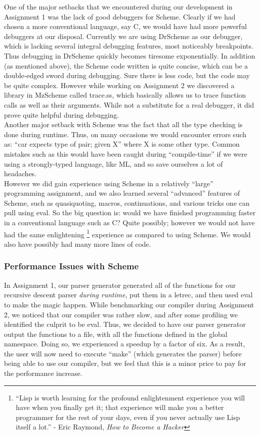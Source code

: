 \documentclass[onecolumn,11pt]{article}
\begin{document}
One of the major setbacks that we encountered during our development in Assignment 1 was the lack of good debuggers for Scheme. Clearly if we had chosen a more conventional language, say C, we would have had more powerful debuggers at our disposal. Currently we are using DrScheme as our debugger, which is lacking several integral debugging features, most noticeably breakpoints. Thus debugging in DrScheme quickly becomes tiresome exponentially. In addition (as mentioned above), the Scheme code written is quite concise, which can be a double-edged sword during debugging. Sure there is less code, but the code may be quite complex. However while working on Assignment 2 we discovered a library in MzScheme called trace.ss, which basically allows us to trace function calls as well as their arguments. While not a substitute for a real debugger, it did prove quite helpful during debugging. \\

Another major setback with Scheme was the fact that all the type checking is done during runtime. Thus, on many occasions we would encounter errors such as: ``car expects type of pair; given X'' where X is some other type. Common mistakes such as this would have been caught during ``compile-time'' if we were using a strongly-typed language, like ML, and so save ourselves a lot of headaches. \\

However we did gain experience using Scheme in a relatively ``large'' programming assignment, and we also learned several ``advanced'' features of Scheme, such as quasiquoting, macros, continuations, and various tricks one can pull using eval. So the big question is: would we have finished programming faster in a conventional language such as C? Quite possibly; however we would not have had the same enlightening \footnote{``Lisp is worth learning for the profound enlightenment experience you will have when you finally get it; that experience will make you a better programmer for the rest of your days, even if you never actually use Lisp itself a lot.'' - Eric Raymond, \emph{How to Become a Hacker}} experience as compared to using Scheme. We would also have possibly had many more lines of code. \\

\subsubsection{Performance Issues with Scheme}
In Assignment 1, our parser generator generated all of the functions for our recursive descent parser \emph{during runtime}, put them in a letrec, and then used eval to make the magic happen. While benchmarking our compiler during Assignment 2, we noticed that our compiler was rather slow, and after some profiling we identified the culprit to be eval. Thus, we decided to have our parser generator output the functions to a file, with all the functions defined in the global namespace. Doing so, we experienced a speedup by a factor of six. As a result, the user will now need to execute ``make'' (which generates the parser) before being able to use our compiler, but we feel that this is a minor price to pay for the performance increase. \\
\end{document}
